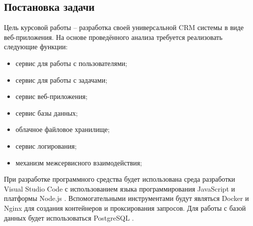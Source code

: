 \subsection{Постановка задачи}

Цель курсовой работы – разработка своей универсальной CRM системы в виде веб-приложения.
На основе проведённого анализа требуется реализовать следующие функции:

\begin{itemize}
    \item сервис для работы с пользователями;
    \item сервис для работы с задачами;
    \item сервис веб-приложения;
    \item сервис базы данных;
    \item облачное файловое хранилище;
    \item сервис логирования;
    \item механизм межсервисного взаимодействия;
\end{itemize}

При разработке программного средства будет использована среда разработки Visual Studio Code \cite{vscodeDOC} 
с использованием языка программирования JavaScript \cite{jsDOC} и платформы Node.js \cite{nodejsDocs}. Вспомогательными инструментами
будут являться Docker \cite{dockerDocs} и Nginx \cite{nginxDocs} для создания контейнеров и проксирования запросов. 
Для работы с базой данных будет использоваться PostgreSQL \cite{postgresqlDocs}.